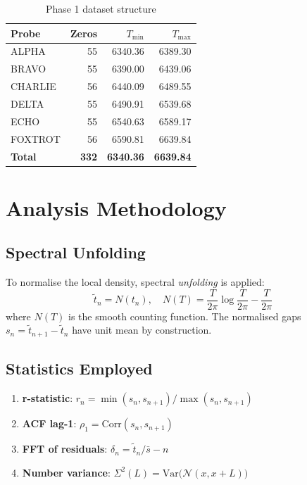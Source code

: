 \documentclass[12pt, a4paper]{article}
\begin{document}
\begin{table}[H]
\centering
\caption{Phase 1 dataset structure}
\begin{tabular}{lrrr}
\toprule
\textbf{Probe} & \textbf{Zeros} & \textbf{$T_{\min}$} & \textbf{$T_{\max}$} \\
\midrule
ALPHA   & 55 & 6340.36 & 6389.30 \\
BRAVO   & 55 & 6390.00 & 6439.06 \\
CHARLIE & 56 & 6440.09 & 6489.55 \\
DELTA   & 55 & 6490.91 & 6539.68 \\
ECHO    & 55 & 6540.63 & 6589.17 \\
FOXTROT & 56 & 6590.81 & 6639.84 \\
\midrule
\textbf{Total} & \textbf{332} & \textbf{6340.36} & \textbf{6639.84} \\
\bottomrule
\end{tabular}
\end{table}

\section{Analysis Methodology}

\subsection{Spectral Unfolding}

To normalise the local density, spectral \emph{unfolding} is applied:
\[
  \tilde{t}_n = N(t_n), \quad
  N(T) = \frac{T}{2\pi}\log\frac{T}{2\pi} - \frac{T}{2\pi}
\]
where $N(T)$ is the smooth counting function. The normalised gaps
$s_n = \tilde{t}_{n+1} - \tilde{t}_n$ have unit mean by construction.

\subsection{Statistics Employed}

\begin{enumerate}
  \item \textbf{r-statistic}: $r_n = \min(s_n, s_{n+1})/\max(s_n, s_{n+1})$
  \item \textbf{ACF lag-1}: $\rho_1 = \mathrm{Corr}(s_n, s_{n+1})$
  \item \textbf{FFT of residuals}: $\delta_n = \tilde{t}_n/\bar{s} - n$
  \item \textbf{Number variance}: $\Sigma^2(L) = \mathrm{Var}\bigl(\mathcal{N}(x, x+L)\bigr)$
\end{enumerate}
\end{document}
